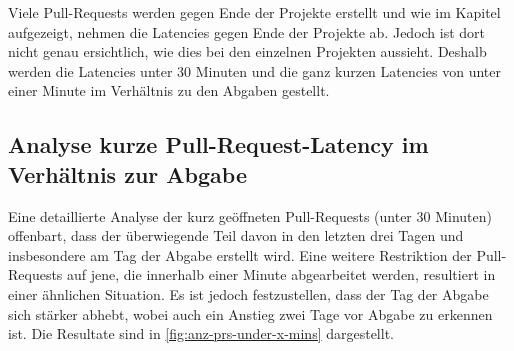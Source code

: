Viele Pull-Requests werden gegen Ende der Projekte erstellt und wie im Kapitel  aufgezeigt, nehmen die Latencies gegen Ende der Projekte ab. Jedoch ist dort nicht genau ersichtlich, wie dies bei den einzelnen Projekten aussieht. Deshalb werden die Latencies unter 30 Minuten und die ganz kurzen Latencies von unter einer Minute im Verhältnis zu den Abgaben gestellt.

\subsection{Analyse kurze Pull-Request-Latency im Verhältnis zur Abgabe }
Eine detaillierte Analyse der kurz geöffneten Pull-Requests (unter 30 Minuten) offenbart, dass der überwiegende Teil davon in den letzten drei Tagen und insbesondere am Tag der Abgabe erstellt wird. Eine weitere Restriktion der Pull-Requests auf jene, die innerhalb einer Minute abgearbeitet werden, resultiert in einer ähnlichen Situation. Es ist jedoch festzustellen, dass der Tag der Abgabe sich stärker abhebt, wobei auch ein Anstieg zwei Tage vor Abgabe zu erkennen ist.  Die Resultate sind in \autoref{fig:anz-prs-under-x-mins} dargestellt.

